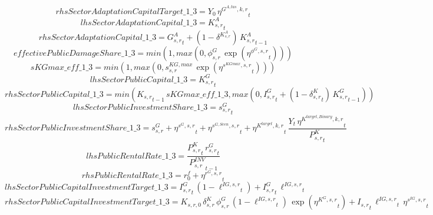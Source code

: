 \begin{dmath*}
rhsSectorAdaptationCapitalTarget\_1\_3 = {{Y_0}}\, {{\eta^{G^{A,tas},k,r}}}_{t}
\end{dmath*}
\begin{dmath*}
lhsSectorAdaptationCapital\_1\_3 = {{K^{A}_{s,r}}}_{t}
\end{dmath*}
\begin{dmath*}
rhsSectorAdaptationCapital\_1\_3 = {{G^{A}_{s,r}}}_{t}+\left(1-{{\delta^{K^{A}_{s,r}}}}\right)\, {{K^{A}_{s,r}}}_{t-1}
\end{dmath*}
\begin{dmath*}
effectivePublicDamageShare\_1\_3 = min(1,max(0,{{\phi^{G}_{s,r}}}\, \exp\left({{\eta^{\phi^{G},s,r}}}_{t}\right)))
\end{dmath*}
\begin{dmath*}
sKGmax\_eff\_1\_3 = min(1,max(0,{{s^{KG,max}_{s,r}}}\, \exp\left({{\eta^{s^{KGmax},s,r}}}_{t}\right)))
\end{dmath*}
\begin{dmath*}
lhsSectorPublicCapital\_1\_3 = {{K^G_{s,r}}}_{t}
\end{dmath*}
\begin{dmath*}
rhsSectorPublicCapital\_1\_3 = min({{K_{s,r}}}_{t-1}\, {sKGmax\_eff\_1\_3},max(0,{{I^G_{s,r}}}_{t}+\left(1-{{\delta^{K}_{s,r}}}_{t}\right)\, {{K^G_{s,r}}}_{t-1}))
\end{dmath*}
\begin{dmath*}
lhsSectorPublicInvestmentShare\_1\_3 = {{s^G_{s,r}}}_{t}
\end{dmath*}
\begin{dmath*}
rhsSectorPublicInvestmentShare\_1\_3 = {{s^{G}_{s,r}}}+{{\eta^{s^G,s,r}}}_{t}+{{\eta^{s^{G,Scen},s,r}}}_{t}+{{\eta^{K^{target},k,r}}}_{t}\, \frac{{Y}_{t}\, {{\eta^{K^{target,Binary},k,r}}}_{t}}{{{P^K_{s,r}}}_{t}}
\end{dmath*}
\begin{dmath*}
lhsPublicRentalRate\_1\_3 = \frac{{{P^K_{s,r}}}_{t}\, {{r^G_{s,r}}}_{t}}{{{P^{INV}_{s,r}}}_{t-1}}
\end{dmath*}
\begin{dmath*}
rhsPublicRentalRate\_1\_3 = {{r^f_0}}+{{\eta^{r^G,s,r}}}_{t}
\end{dmath*}
\begin{dmath*}
lhsSectorPublicCapitalInvestmentTarget\_1\_3 = {{I^G_{s,r}}}_{t}\, \left(1-{{\ell^{IG,s,r}}}_{t}\right)+{{I^G_{s,r}}}_{t}\, {{\ell^{IG,s,r}}}_{t}
\end{dmath*}
\begin{dmath*}
rhsSectorPublicCapitalInvestmentTarget\_1\_3 = {{K_{s,r,0}}}\, {{\delta^{K}_{s,r}}}\, {{\phi^{G}_{s,r}}}\, \left(1-{{\ell^{IG,s,r}}}_{t}\right)\, \exp\left({{\eta^{K^G,s,r}}}_{t}\right)+{{I_{s,r}}}_{t}\, {{\ell^{IG,s,r}}}_{t}\, {{\eta^{s^{IG},s,r}}}_{t}
\end{dmath*}
